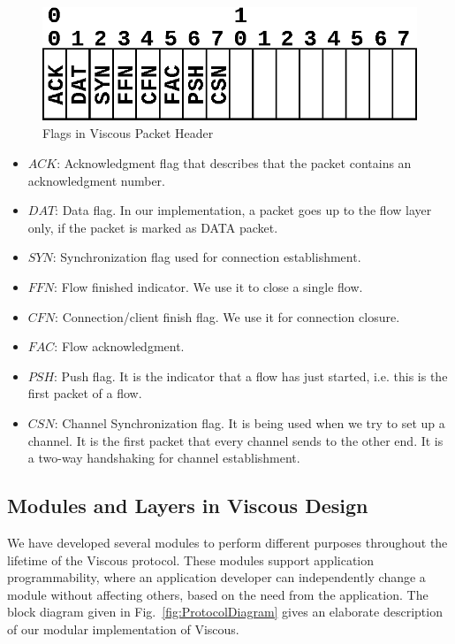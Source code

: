 \begin{figure}[!ht]
    \centering
    \includegraphics[width=.5\linewidth]{img/flags}
    \caption{Flags in Viscous Packet Header}
    \label{fig:flags}
\end{figure}

\begin{itemize}
    \item \textbf{$ACK$}: Acknowledgment flag that describes that the packet contains an acknowledgment number.
    \item \textbf{$DAT$}: Data flag. In our implementation, a packet goes up to the flow layer only, if the packet is marked as DATA packet.
    \item \textbf{$SYN$}: Synchronization flag used for connection establishment.
    \item \textbf{$FFN$}: Flow finished indicator. We use it to close a single flow.
    \item \textbf{$CFN$}: Connection/client finish flag. We use it for connection closure.
    \item \textbf{$FAC$}: Flow acknowledgment. 
    \item \textbf{$PSH$}: Push flag. It is the indicator that a flow has just started, i.e. this is the first packet of a flow.
    \item \textbf{$CSN$}: Channel Synchronization flag. It is being used when we try to set up a channel. It is the first packet that every channel sends to the other end. It is a two-way handshaking for channel establishment.
\end{itemize}


\subsection{Modules and Layers in Viscous Design}
We have developed several modules to perform different purposes throughout the lifetime of the Viscous protocol. These modules support application programmability, where an application developer can independently change a module without affecting others, based on the need from the application. The block diagram given in Fig.~\ref{fig:ProtocolDiagram} gives an elaborate description of our modular implementation of Viscous.


